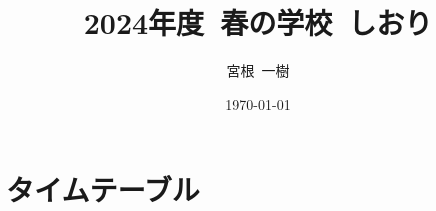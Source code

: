 \documentclass[a4paper,uplatex,dvipdfmx,10pt]{jsarticle}
\title{
    2024年度\ 春の学校\ しおり
}
\author{
  宮根\ 一樹
}
\date{\today}
\theoremstyle{definition}
\begin{document}
\maketitle
\tableofcontents

\clearpage
\section{タイムテーブル}
\end{document}
